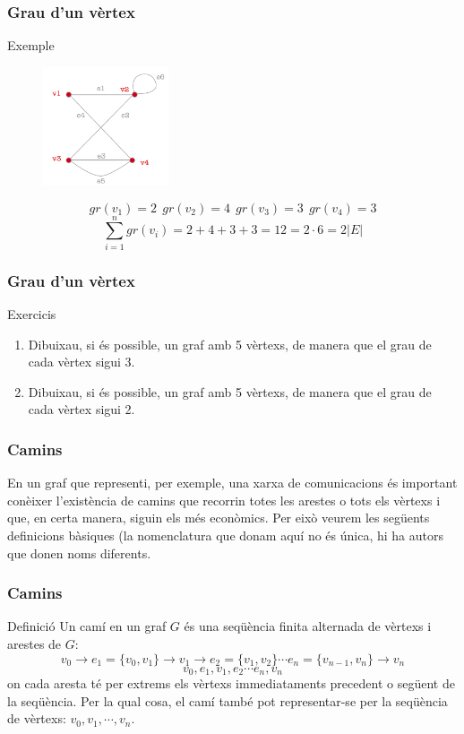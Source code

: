 \documentclass{beamer}
\begin{document}
\begin{frame}
\frametitle{Grau d'un vèrtex}

\begin{block}{Exemple}
\begin{figure}[h]
 \label{fig:volum}
\centering
\includegraphics[height=3.5cm]{g4}
\end{figure}
\[gr(v_1) = 2\ \ gr(v_2) = 4\ \ gr(v_3) = 3\ \ gr(v_4) = 3\]
\[\displaystyle\sum_{i=1}^n gr(v_i) = 2 + 4 + 3 +3 = 12 = 2\cdot 6 =  2|E|\]
\end{block}
\end{frame}



\begin{frame}
\frametitle{Grau d'un vèrtex}

\begin{block}{Exercicis}
\begin{enumerate}
\item Dibuixau, si és possible, un graf amb 5 vèrtexs, de manera que el grau de cada vèrtex sigui 3. 
\item Dibuixau, si és possible, un graf amb 5 vèrtexs, de manera que el grau de cada vèrtex sigui 2. 
\end{enumerate}
\end{block}
\end{frame}




\begin{frame}
\frametitle{Camins}
En un graf que representi, per exemple, una xarxa de comunicacions és important conèixer l'existència de camins que recorrin totes les arestes o tots els vèrtexs i que, en certa manera, siguin els més econòmics. Per eixò veurem les següents definicions bàsiques (la nomenclatura que donam aquí no és única, hi ha autors que donen noms diferents. 
\end{frame}


\begin{frame}
\frametitle{Camins}
\begin{block}{Definició}
Un camí en un graf $G$ és una seqüència finita alternada de vèrtexs i arestes de $G$:
\[v_0\rightarrow e_1 = \{v_0,v_1\}\rightarrow v_1 \rightarrow e_2 = \{v_1,v_2\} \cdots  e_n = \{v_{n-1},v_n\}\rightarrow v_n\]
\[v_0,e_1,v_1,e_2\cdots e_n,v_n\]
on cada aresta té per extrems els vèrtexs immediataments precedent o següent de la seqüència. Per la qual cosa, el camí també pot representar-se per la seqüència de vèrtexs: $v_0,v_1,\cdots,v_n$.
\end{block}
\end{frame}
\end{document}
